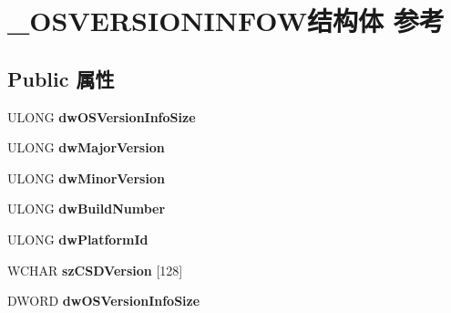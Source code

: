\hypertarget{struct___o_s_v_e_r_s_i_o_n_i_n_f_o_w}{}\section{\+\_\+\+O\+S\+V\+E\+R\+S\+I\+O\+N\+I\+N\+F\+O\+W结构体 参考}
\label{struct___o_s_v_e_r_s_i_o_n_i_n_f_o_w}
\subsection*{Public 属性}
\begin{DoxyCompactItemize}
\item 
\mbox{\label{struct___o_s_v_e_r_s_i_o_n_i_n_f_o_w_ab5ffdfe0f4c5f74ffc69cab3478af0a2}} 
U\+L\+O\+NG {\bfseries dw\+O\+S\+Version\+Info\+Size}
\item 
\mbox{\label{struct___o_s_v_e_r_s_i_o_n_i_n_f_o_w_acc689ea2ecde3a4b695823b5d516e98e}} 
U\+L\+O\+NG {\bfseries dw\+Major\+Version}
\item 
\mbox{\label{struct___o_s_v_e_r_s_i_o_n_i_n_f_o_w_a1a34965c80e530880a4f24270065093b}} 
U\+L\+O\+NG {\bfseries dw\+Minor\+Version}
\item 
\mbox{\label{struct___o_s_v_e_r_s_i_o_n_i_n_f_o_w_adedec4b6872b007134f5daecdaee21e2}} 
U\+L\+O\+NG {\bfseries dw\+Build\+Number}
\item 
\mbox{\label{struct___o_s_v_e_r_s_i_o_n_i_n_f_o_w_a22ac0f4fa7409a9f104374ea170c17b3}} 
U\+L\+O\+NG {\bfseries dw\+Platform\+Id}
\item 
\mbox{\label{struct___o_s_v_e_r_s_i_o_n_i_n_f_o_w_ae37c5c0b4cfe20fd2bcc883d8a0a080c}} 
W\+C\+H\+AR {\bfseries sz\+C\+S\+D\+Version} \mbox{[}128\mbox{]}
\item 
\mbox{\label{struct___o_s_v_e_r_s_i_o_n_i_n_f_o_w_ac3118a769895ad31365c25c0b91136d2}} 
D\+W\+O\+RD {\bfseries dw\+O\+S\+Version\+Info\+Size}
\item 
\mbox{\label{struct___o_s_v_e_r_s_i_o_n_i_n_f_o_w_aa15c33b2744a3427075a2b260e48c15c}} 

\end{DoxyCompactItemize}
